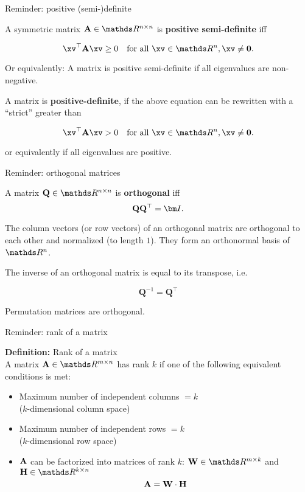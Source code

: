 \begin{vbframe}{Reminder: positive (semi-)definite}

A symmetric matrix $\Amat \in \R^{n \times n}$ is \textbf{positive semi-definite} iff

$$
\xv^{\top}\Amat\xv \ge 0 \quad \text{for all } \xv \in \R^n, \xv \ne \boldsymbol{0}.
$$

Or equivalently: A matrix is positive semi-definite if all eigenvalues are non-negative. 

\lz

A matrix is \textbf{positive-definite}, if the above equation can be rewritten with a \enquote{strict} greater than

$$
\xv^{\top}\Amat\xv > 0 \quad \text{for all }\xv \in \R^n, \xv \ne \boldsymbol{0}.
$$

or equivalently if all eigenvalues are positive. 

\end{vbframe}

\begin{vbframe}{Reminder: orthogonal matrices}

A matrix $\mathbf{Q} \in \R^{n \times n}$ is \textbf{orthogonal} iff
$$
\mathbf{Q}\mathbf{Q}^{\top} = \id.
$$

The column vectors (or row vectors) of an orthogonal matrix are orthogonal to each other and normalized (to length $1$). They form an orthonormal basis of $\R^n$.

\lz

The inverse of an orthogonal matrix is equal to its transpose, i.e. 

$$
\mathbf{Q}^{-1} = \mathbf{Q}^{\top}
$$

Permutation matrices are orthogonal.

\end{vbframe}

\begin{vbframe}{Reminder: rank of a matrix}

\textbf{Definition: } Rank of a matrix \\

A matrix $\Amat \in \R^{m\times n}$ has rank $k$ if one of the following equivalent conditions is met:

\begin{itemize}
\item Maximum number of independent columns $= k$ \\
($k$-dimensional column space)
\item Maximum number of independent rows $=k$ \\
($k$-dimensional row space)
\item $\mathbf{A}$ can be factorized into matrices of rank $k$: $\mathbf{W} \in \R^{m \times k}$ and $\mathbf{H} \in \R^{k\times n}$
$$
\mathbf{A} = \mathbf{W} \cdot \mathbf{H}
$$
\end{itemize}

\end{vbframe}





\endlecture








